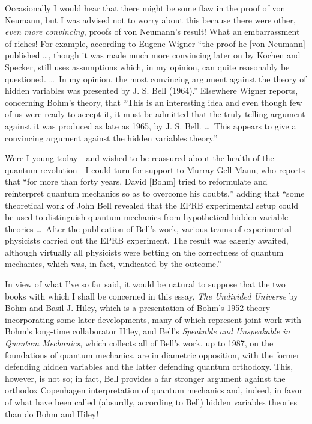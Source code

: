 Occasionally I would hear that there might be some flaw in the proof of von
Neumann, but I was advised not to worry about this because there were
other, {\it even more convincing\/}, proofs of von Neumann's result! What
an embarrassment of riches! For example, according to Eugene Wigner \cite[page
291]{Wigner1} ``the proof he [von Neumann] published \dots, though it was
made much more convincing later on by Kochen and Specker, still uses
assumptions which, in my opinion, can quite reasonably be questioned. \dots\
In my opinion, the most convincing argument against the theory of hidden
variables was presented by J. S. Bell (1964).'' Elsewhere \cite{Wigner2}
Wigner reports, concerning Bohm's theory, that ``This is an interesting
idea and even though few of us were ready to accept it, it must be admitted
that the truly telling argument against it was produced as late as 1965, by
J. S.  Bell. \dots\  This appears to give a convincing argument against the
hidden variables theory.''

Were I young today---and wished to be reassured about the health of the
quantum revolution---I could turn for support to Murray Gell-Mann, who
reports \cite{GM} that ``for more than forty years, David [Bohm] tried to
reformulate and reinterpret quantum mechanics so as to overcome his
doubts,'' adding that ``some theoretical work of John Bell revealed that
the EPRB experimental setup could be used to distinguish quantum mechanics
{}from hypothetical hidden variable theories \dots\  After the publication of
Bell's work, various teams of experimental physicists carried out the EPRB
experiment. The result was eagerly awaited, although virtually all
physicists were betting on the correctness of quantum mechanics, which was,
in fact, vindicated by the outcome.''

In view of what I've so far said, it would be natural to suppose that the
two books with which I shall be concerned in this essay, {\it The Undivided
Universe\/} by Bohm and Basil J. Hiley, which is a presentation of Bohm's
1952 theory incorporating some later developments, many of which represent
joint work with Bohm's long-time collaborator Hiley, and Bell's {\it
Speakable and Unspeakable in Quantum Mechanics\/}, which collects all of
Bell's work, up to 1987, on the foundations of quantum mechanics, are in
diametric opposition, with the former defending hidden variables and the
latter defending quantum orthodoxy. This, however, is not so; in fact, Bell
provides a far stronger argument against the orthodox Copenhagen
interpretation of quantum mechanics and, indeed, in favor of what have been
called (absurdly, according to Bell) hidden variables theories than do Bohm
and Hiley!

